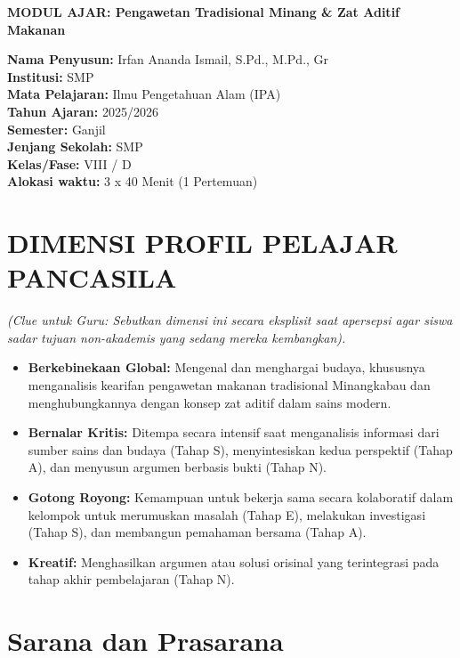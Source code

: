 \documentclass[a4paper,12pt]{article}
\begin{document}
\begin{center}
{\Large\textbf{MODUL AJAR: Pengawetan Tradisional Minang \& Zat Aditif Makanan}}
\end{center}

\vspace{0.5cm}

\begin{tcolorbox}[mainbox]
\textbf{Nama Penyusun:} Irfan Ananda Ismail, S.Pd., M.Pd., Gr \\
\textbf{Institusi:} SMP \\
\textbf{Mata Pelajaran:} Ilmu Pengetahuan Alam (IPA) \\
\textbf{Tahun Ajaran:} 2025/2026 \\
\textbf{Semester:} Ganjil \\
\textbf{Jenjang Sekolah:} SMP \\
\textbf{Kelas/Fase:} VIII / D \\
\textbf{Alokasi waktu:} 3 x 40 Menit (1 Pertemuan)
\end{tcolorbox}

\section{DIMENSI PROFIL PELAJAR PANCASILA}
\textit{(Clue untuk Guru: Sebutkan dimensi ini secara eksplisit saat apersepsi agar siswa sadar tujuan non-akademis yang sedang mereka kembangkan).}

\begin{itemize}
\item \textbf{Berkebinekaan Global:} Mengenal dan menghargai budaya, khususnya menganalisis kearifan pengawetan makanan tradisional Minangkabau dan menghubungkannya dengan konsep zat aditif dalam sains modern.
\item \textbf{Bernalar Kritis:} Ditempa secara intensif saat menganalisis informasi dari sumber sains dan budaya (Tahap S), menyintesiskan kedua perspektif (Tahap A), dan menyusun argumen berbasis bukti (Tahap N).
\item \textbf{Gotong Royong:} Kemampuan untuk bekerja sama secara kolaboratif dalam kelompok untuk merumuskan masalah (Tahap E), melakukan investigasi (Tahap S), dan membangun pemahaman bersama (Tahap A).
\item \textbf{Kreatif:} Menghasilkan argumen atau solusi orisinal yang terintegrasi pada tahap akhir pembelajaran (Tahap N).
\end{itemize}

\section{Sarana dan Prasarana}
\end{document}
